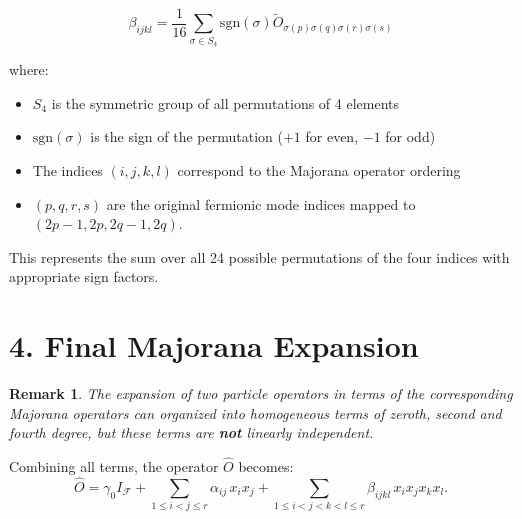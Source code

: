 \documentclass[aps,preprint]{revtex4}%
\newtheorem{remark}[theorem]{Remark}
\begin{document}
\[
\beta_{ijkl}=\frac{1}{16}\sum_{\sigma\in S_{4}}\text{sgn}(\sigma)\tilde
{O}_{\sigma(p)\sigma(q)\sigma(r)\sigma(s)}%
\]


where:

\begin{itemize}
\item $S_{4}$ is the symmetric group of all permutations of 4 elements

\item $\text{sgn}(\sigma)$ is the sign of the permutation ($+1$ for even, $-1$
for odd)

\item The indices $(i,j,k,l)$ correspond to the Majorana operator ordering

\item $(p,q,r,s)$ are the original fermionic mode indices mapped to
$(2p-1,2p,2q-1,2q)$.
\end{itemize}

This represents the sum over all 24 possible permutations of the four indices
with appropriate sign factors.

\section{4. Final Majorana Expansion}

\begin{remark}
The expansion of two particle operators in terms of the corresponding Majorana
operators can organized into homogeneous terms of zeroth, second and fourth
degree, but these terms are \textbf{not} linearly independent.
\end{remark}

Combining all terms, the operator $\hat{O}$ becomes:
\[
\hat{O}=\gamma_{0}I_{\mathcal{F}}+\sum_{1\leq i<j\leq r}\alpha_{ij}%
\,x_{i}x_{j}+\sum_{1\leq i<j<k<l\leq r}\beta_{ijkl}\,x_{i}x_{j}x_{k}x_{l}.
\]
\end{document}
